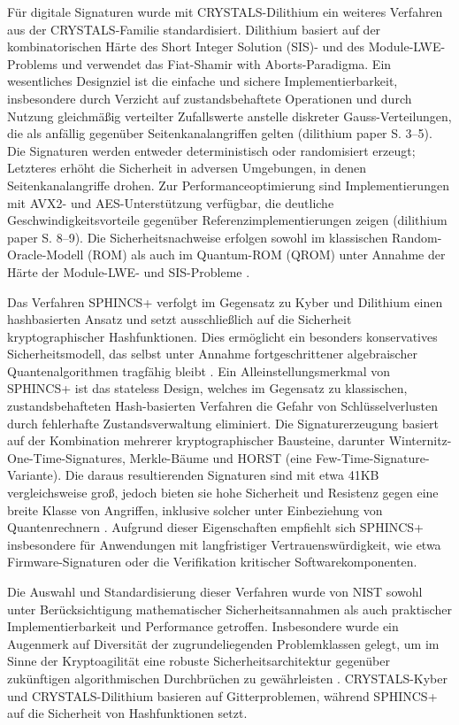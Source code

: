 Für digitale Signaturen wurde mit CRYSTALS-Dilithium ein weiteres Verfahren aus der CRYSTALS-Familie standardisiert. Dilithium basiert auf der kombinatorischen Härte des Short Integer Solution (SIS)- und des Module-LWE-Problems und verwendet das Fiat-Shamir with Aborts-Paradigma. Ein wesentliches Designziel ist die einfache und sichere Implementierbarkeit, insbesondere durch Verzicht auf zustandsbehaftete Operationen und durch Nutzung gleichmäßig verteilter Zufallswerte anstelle diskreter Gauss-Verteilungen, die als anfällig gegenüber Seitenkanalangriffen gelten (dilithium paper S. 3–5). Die Signaturen werden entweder deterministisch oder randomisiert erzeugt; Letzteres erhöht die Sicherheit in adversen Umgebungen, in denen Seitenkanalangriffe drohen. Zur Performanceoptimierung sind Implementierungen mit AVX2- und AES-Unterstützung verfügbar, die deutliche Geschwindigkeitsvorteile gegenüber Referenzimplementierungen zeigen (dilithium paper S. 8–9). Die Sicherheitsnachweise erfolgen sowohl im klassischen Random-Oracle-Modell (ROM) als auch im Quantum-ROM (QROM) unter Annahme der Härte der Module-LWE- und SIS-Probleme \cite[S. 6-7]{schwabe_dilithium_nodate}.

Das Verfahren SPHINCS+ verfolgt im Gegensatz zu Kyber und Dilithium einen hashbasierten Ansatz und setzt ausschließlich auf die Sicherheit kryptographischer Hashfunktionen. Dies ermöglicht ein besonders konservatives Sicherheitsmodell, das selbst unter Annahme fortgeschrittener algebraischer Quantenalgorithmen tragfähig bleibt \cite[s. 1-2]{schwabe_sphincs_2025}. Ein Alleinstellungsmerkmal von SPHINCS+ ist das stateless Design, welches im Gegensatz zu klassischen, zustandsbehafteten Hash-basierten Verfahren die Gefahr von Schlüsselverlusten durch fehlerhafte Zustandsverwaltung eliminiert. Die Signaturerzeugung basiert auf der Kombination mehrerer kryptographischer Bausteine, darunter Winternitz-One-Time-Signatures, Merkle-Bäume und HORST (eine Few-Time-Signature-Variante). Die daraus resultierenden Signaturen sind mit etwa 41KB vergleichsweise groß, jedoch bieten sie hohe Sicherheit und Resistenz gegen eine breite Klasse von Angriffen, inklusive solcher unter Einbeziehung von Quantenrechnern \cite[S. 4-5]{schwabe_sphincs_2025}. Aufgrund dieser Eigenschaften empfiehlt sich SPHINCS+ insbesondere für Anwendungen mit langfristiger Vertrauenswürdigkeit, wie etwa Firmware-Signaturen oder die Verifikation kritischer Softwarekomponenten.

Die Auswahl und Standardisierung dieser Verfahren wurde von NIST sowohl unter Berücksichtigung mathematischer Sicherheitsannahmen als auch praktischer Implementierbarkeit und Performance getroffen. Insbesondere wurde ein Augenmerk auf Diversität der zugrundeliegenden Problemklassen gelegt, um im Sinne der Kryptoagilität eine robuste Sicherheitsarchitektur gegenüber zukünftigen algorithmischen Durchbrüchen zu gewährleisten \cite[S. 4, 9]{alagic_status_2025}. CRYSTALS-Kyber und CRYSTALS-Dilithium basieren auf Gitterproblemen, während SPHINCS+ auf die Sicherheit von Hashfunktionen setzt.

